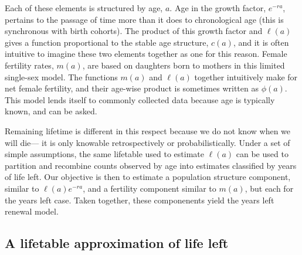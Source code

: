 \documentclass[12pt,oneside,a4paper,leqno]{article}
\begin{document}
Each of these elements is structured by
age, $a$. %
Age in the growth factor, $e^{-ra}$, pertains to the passage of
time more than it does to chronological age (this is synchronous with birth
cohorts). The product of this growth factor and $\ell(a)$ gives a
function proportional to the stable age structure, $c(a)$, and it is often
intuitive to imagine these two elements together as one for this reason. Female
fertility rates, $m(a)$, are based on daughters born to mothers in this limited
single-sex model. The functions $m(a)$ and $\ell(a)$
together intuitively make for net female fertility, and their age-wise product
is sometimes written as $\phi(a)$. This model lends itself to commonly collected data because age
is typically known, and can be asked.

Remaining lifetime is different in this respect because we do not know when we
will die--- it is only knowable retrospectively or probabilistically. Under a set of simple assumptions, the same lifetable used to
estimate $\ell(a)$ can be used to
partition and recombine counts observed by age into estimates
classified by years of life left. Our objective is then to estimate a population
structure component, similar to $\ell(a)e^{-ra}$, and a fertility component
similar to $m(a)$, but each for the years left case. Taken together, these
componenents yield the years left renewal model.

\subsection*{A lifetable approximation of life left}
\end{document}
